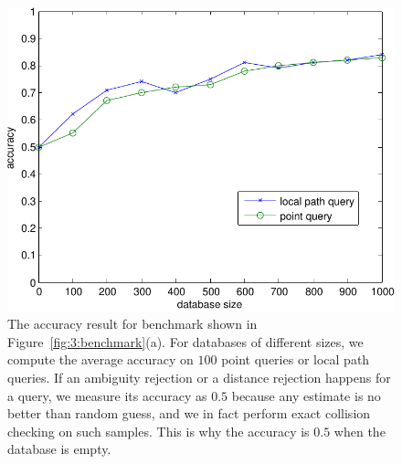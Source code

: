 \begin{figure}[t]
  \centering
  \includegraphics[width=0.8\linewidth]{figs/3/accuracy-crop.pdf}
  \caption[Accuracy of instance-based learning framework on various benchmarks.]{\label{fig:3:accuracy} The accuracy result for benchmark shown in Figure~\ref{fig:3:benchmark}(a). For databases of different sizes, we compute the average accuracy on $100$ point queries or local path queries. If an ambiguity rejection or a distance rejection happens for a query, we measure its accuracy as $0.5$ because any estimate is no better than random guess, and we in fact perform exact collision checking on such samples. This is why the accuracy is $0.5$ when the database is empty.}
\end{figure}




